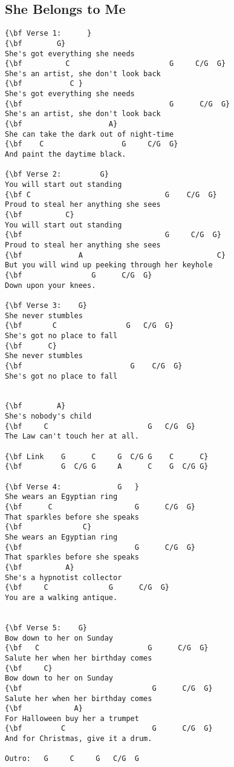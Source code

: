\documentclass[a4paper]{article}
\begin{document}
\subsection{She Belongs to Me} %
\label{sub:She Belongs to Me}
\begin{multicols}{2}
\begin{Verbatim}[commandchars=\\\{\}]
{\bf Verse 1:      }
{\bf        G}
She's got everything she needs
{\bf          C                       G     C/G  G}
She's an artist, she don't look back
{\bf           C }
She's got everything she needs
{\bf                                  G      C/G  G}
She's an artist, she don't look back
{\bf                    A}
She can take the dark out of night-time
{\bf    C                  G     C/G  G}
And paint the daytime black.

{\bf Verse 2:         G}
You will start out standing
{\bf C                               G    C/G  G}
Proud to steal her anything she sees
{\bf          C}
You will start out standing
{\bf                                 G     C/G  G}
Proud to steal her anything she sees
{\bf             A                               C}
But you will wind up peeking through her keyhole
{\bf                G      C/G  G}
Down upon your knees.

{\bf Verse 3:    G}
She never stumbles
{\bf       C                G   C/G  G}
She's got no place to fall
{\bf      C}
She never stumbles
{\bf                         G    C/G  G}
She's got no place to fall


{\bf        A}
She's nobody's child
{\bf     C                       G   C/G  G}
The Law can't touch her at all.

{\bf Link    G      C     G  C/G G    C      C}
{\bf         G  C/G G     A      C    G  C/G G}

{\bf Verse 4:             G   }
She wears an Egyptian ring
{\bf      C                   G      C/G  G}
That sparkles before she speaks
{\bf              C}
She wears an Egyptian ring
{\bf                          G      C/G  G}
That sparkles before she speaks
{\bf          A}
She's a hypnotist collector
{\bf     C              G      C/G  G}
You are a walking antique.


{\bf Verse 5:    G}
Bow down to her on Sunday
{\bf   C                         G      C/G  G}
Salute her when her birthday comes
{\bf     C}
Bow down to her on Sunday
{\bf                              G      C/G  G}
Salute her when her birthday comes
{\bf            A}
For Halloween buy her a trumpet
{\bf         C                    G      C/G  G}
And for Christmas, give it a drum.

Outro:   G     C     G   C/G  G
\end{Verbatim}
\end{multicols}
\newpage
\end{document}
